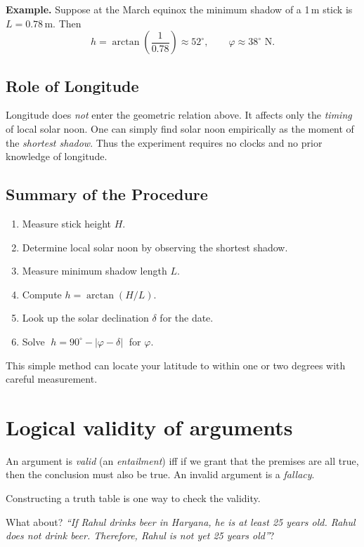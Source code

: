 \documentclass[11pt]{article}
\begin{document}
\medskip
\noindent\textbf{Example.}
Suppose at the March equinox the minimum shadow of a 1\,m stick is
$L = 0.78\,$m.
Then
\[
h = \arctan\!\left(\frac{1}{0.78}\right) \approx 52^\circ,
\qquad
\varphi \approx 38^\circ \text{ N}.
\]

\subsection*{Role of Longitude}

Longitude does \emph{not} enter the geometric relation above. It affects only
the \emph{timing} of local solar noon. One can simply find solar noon
empirically as the moment of the \emph{shortest shadow}. Thus the experiment
requires no clocks and no prior knowledge of longitude.

\subsection*{Summary of the Procedure}

\begin{enumerate}
    \item Measure stick height $H$.
    \item Determine local solar noon by observing the shortest shadow.
    \item Measure minimum shadow length $L$.
    \item Compute $h = \arctan(H/L)$.
    \item Look up the solar declination $\delta$ for the date.
    \item Solve $\;h = 90^\circ - |\varphi - \delta|\;$ for $\varphi$.
\end{enumerate}

This simple method can locate your latitude to within one or two degrees with
careful measurement.

\section{Logical validity of arguments}
An argument is \emph{valid} (an \emph{entailment}) iff if we grant that the premises are all true, then the conclusion must also be true.
An invalid argument is a \emph{fallacy}.

Constructing a truth table is one way to check the validity.

What about?
\emph{``If Rahul drinks beer in Haryana, he is at least 25 years old. Rahul does not drink beer. Therefore, Rahul is not yet 25 years old''}?
\end{document}
